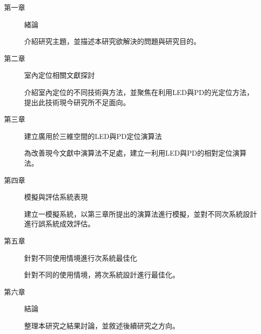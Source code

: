 \begin{description}
    \item[第一章] 緒論
    
    \qquad 介紹研究主題，並描述本研究欲解決的問題與研究目的。
    
    \item[第二章] 室內定位相關文獻探討
    
    \qquad 
    介紹室內定位的不同技術與方法，並聚焦在利用LED與PD的光定位方法，提出此技術現今研究所不足面向。
    
    \item[第三章] 建立廣用於三維空間的LED與PD定位演算法
    
    \qquad 
    為改善現今文獻中演算法不足處，建立一利用LED與PD的相對定位演算法。

    \item[第四章] 模擬與評估系統表現
    
    \qquad 
    建立一模擬系統，以第三章所提出的演算法進行模擬，並對不同次系統設計進行誤系統成效評估。
    
    \item[第五章] 針對不同使用情境進行次系統最佳化
    
    \qquad 
    針對不同的使用情境，將次系統設計進行最佳化。
    
    \item[第六章] 結論
    
    \qquad 
    整理本研究之結果討論，並敘述後續研究之方向。
    
    \end{description}







